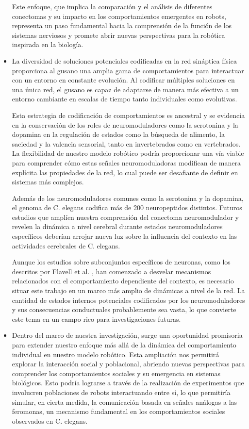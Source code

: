 \begin{itemize}
Este enfoque, que implica la comparación y el análisis de diferentes conectomas y su impacto en los comportamientos emergentes en robots, representa un paso fundamental hacia la comprensión de la función de los sistemas nerviosos y promete abrir nuevas perspectivas para la robótica inspirada en la biología.

\item La diversidad de soluciones potenciales codificadas en la red sináptica física proporciona al gusano una amplia gama de comportamientos para interactuar con un entorno en constante evolución. Al codificar múltiples soluciones en una única red, el gusano es capaz de adaptarse de manera más efectiva a un entorno cambiante en escalas de tiempo tanto individuales como evolutivas.

Esta estrategia de codificación de comportamientos es ancestral y se evidencia en la conservación de los roles de neuromoduladores como la serotonina y la dopamina en la regulación de estados como la búsqueda de alimento, la saciedad y la valencia sensorial, tanto en invertebrados como en vertebrados. La flexibilidad de nuestro modelo robótico podría proporcionar una vía viable para comprender cómo estas señales neuromoduladoras modifican de manera explícita las propiedades de la red, lo cual puede ser desafiante de definir en sistemas más complejos.

Además de los neuromoduladores comunes como la serotonina y la dopamina, el genoma de C. elegans codifica más de 200 neuropeptidos distintos. Futuros estudios que amplíen nuestra comprensión del conectoma neuromodulador y revelen la dinámica a nivel cerebral durante estados neuromoduladores específicos deberían arrojar nueva luz sobre la influencia del contexto en las actividades cerebrales de C. elegans.

Aunque los estudios sobre subconjuntos específicos de neuronas, como los descritos por Flavell et al. \cite{flavell_dynamic_2022}, han comenzado a desvelar mecanismos relacionados con el comportamiento dependiente del contexto, es necesario situar este trabajo en un marco más amplio de dinámicas a nivel de la red. La cantidad de estados internos potenciales codificados por los neuromoduladores y sus consecuencias conductuales probablemente sea vasta, lo que convierte este tema en un campo rico para investigaciones futuras.

\item Dentro del marco de nuestra investigación, surge una oportunidad promisoria para extender nuestro enfoque más allá de la dinámica del comportamiento individual en nuestro modelo robótico. Esta ampliación nos permitirá explorar la interacción social y poblacional, abriendo nuevas perspectivas para comprender los comportamientos sociales y su emergencia en sistemas biológicos. Esto podría lograrse a través de la realización de experimentos que involucren poblaciones de robots interactuando entre sí, lo que permitiría simular, en cierta medida, la comunicación basada en señales análogas a las feromonas, un mecanismo fundamental en los comportamientos sociales observados en C. elegans.


\end{itemize}
